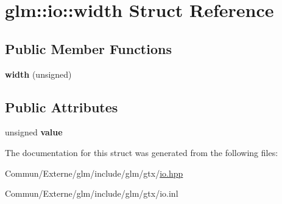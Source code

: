 \hypertarget{structglm_1_1io_1_1width}{}\section{glm\+:\+:io\+:\+:width Struct Reference}
\label{structglm_1_1io_1_1width}
\subsection*{Public Member Functions}
\begin{DoxyCompactItemize}
\item 
{\bfseries width} (unsigned)\hypertarget{structglm_1_1io_1_1width_a1576674b7e08dc5014ce4f41ac6eea5b}{}\label{structglm_1_1io_1_1width_a1576674b7e08dc5014ce4f41ac6eea5b}

\end{DoxyCompactItemize}
\subsection*{Public Attributes}
\begin{DoxyCompactItemize}
\item 
unsigned {\bfseries value}\hypertarget{structglm_1_1io_1_1width_a6bf1338eb947811d36ec93bd2e9b8425}{}\label{structglm_1_1io_1_1width_a6bf1338eb947811d36ec93bd2e9b8425}

\end{DoxyCompactItemize}


The documentation for this struct was generated from the following files\+:\begin{DoxyCompactItemize}
\item 
Commun/\+Externe/glm/include/glm/gtx/\hyperlink{io_8hpp}{io.\+hpp}\item 
Commun/\+Externe/glm/include/glm/gtx/io.\+inl\end{DoxyCompactItemize}
